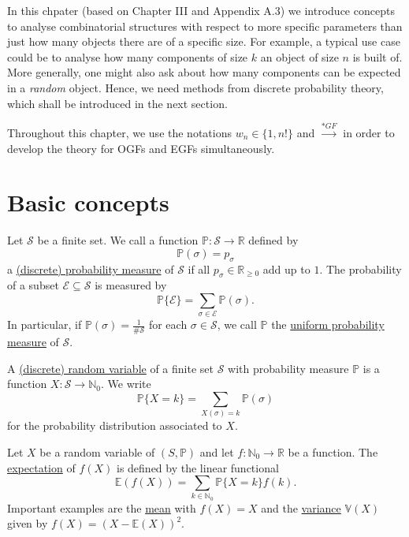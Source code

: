 In this chpater (based on \cite{analyticcombinatorics} Chapter III and Appendix A.3) we introduce concepts to analyse combinatorial structures with respect to more specific parameters than just how many objects there are of a specific size.
For example, a typical use case could be to analyse how many components of size $k$ an object of size $n$ is built of.
More generally, one might also ask about how many components can be expected in a \textit{random} object.
Hence, we need methods from discrete probability theory, which shall be introduced in the next section.

Throughout this chapter, we use the notations $w_n \in \{1, n!\}$ and $\xrightarrow{*GF}$ in order to develop the theory for OGFs and EGFs simultaneously.

\section{Basic concepts}

\begin{defn}
Let $\mathcal{S}$ be a finite set. 
We call a function $\mathbb{P}: \mathcal{S} \to \mathbb{R}$ defined by
\begin{equation*}
    \mathbb{P}(\sigma) = p_\sigma
\end{equation*}
a \ul{(discrete) probability measure} of $\mathcal{S}$ if all $p_\sigma \in \mathbb{R}_{\geq 0}$ add up to $1$. The probability of a subset $\mathcal{E} \subseteq \mathcal{S}$ is measured by
\begin{equation*}
    \mathbb{P} \{ \mathcal{E} \} = \sum_{\sigma \in \mathcal{E}} \mathbb{P}(\sigma).
\end{equation*}
In particular, if $\mathbb{P}(\sigma) = \frac{1}{\# \mathcal{S}}$ for each $\sigma \in \mathcal{S}$, we call $\mathbb{P}$ the \ul{uniform probability measure} of $\mathcal{S}$.
\end{defn}

\begin{defn}
A \ul{(discrete) random variable} of a finite set $\mathcal{S}$ with probability measure $\mathbb{P}$ is a function $X: \mathcal{S} \to \mathbb{N}_0$.
We write
\begin{equation*}
    \mathbb{P}\{X = k\} = \sum_{X(\sigma) = k} \mathbb{P}(\sigma)
\end{equation*}
for the probability distribution associated to $X$.
\end{defn}

\begin{defn}
Let $X$ be a random variable of $(S, \mathbb{P})$ and let $f: \mathbb{N}_0 \to \mathbb{R}$ be a function. The \underline{expectation} of $f(X)$ is defined by the linear functional
\begin{equation}
\label{eq:expectation}
    \mathbb{E}(f(X)) = \sum_{k \in \mathbb{N}_0} \mathbb{P}\{ X = k \} f(k).
\end{equation}
Important examples are the \ul{mean} with $f(X) = X$ and the \ul{variance} $\mathbb{V}(X)$ given by $f(X) = (X - \mathbb{E}(X))^2$.
\end{defn}

